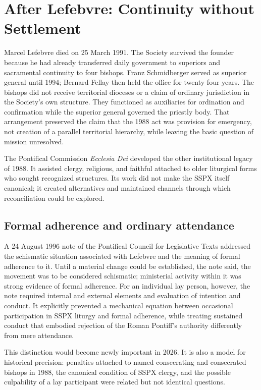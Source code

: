 \section{After Lefebvre: Continuity without Settlement}

Marcel Lefebvre died on 25 March 1991. The Society survived the founder because he had already transferred daily government to superiors and sacramental continuity to four bishops. Franz Schmidberger served as superior general until 1994; Bernard Fellay then held the office for twenty-four years. The bishops did not receive territorial dioceses or a claim of ordinary jurisdiction in the Society's own structure. They functioned as auxiliaries for ordination and confirmation while the superior general governed the priestly body. That arrangement preserved the claim that the 1988 act was provision for emergency, not creation of a parallel territorial hierarchy, while leaving the basic question of mission unresolved.

The Pontifical Commission \emph{Ecclesia Dei} developed the other institutional legacy of 1988. It assisted clergy, religious, and faithful attached to older liturgical forms who sought recognized structures. Its work did not make the SSPX itself canonical; it created alternatives and maintained channels through which reconciliation could be explored.

\subsection{Formal adherence and ordinary attendance}

A 24 August 1996 note of the Pontifical Council for Legislative Texts addressed the schismatic situation associated with Lefebvre and the meaning of formal adherence to it. Until a material change could be established, the note said, the movement was to be considered schismatic; ministerial activity within it was strong evidence of formal adherence. For an individual lay person, however, the note required internal and external elements and evaluation of intention and conduct. It explicitly prevented a mechanical equation between occasional participation in SSPX liturgy and formal adherence, while treating sustained conduct that embodied rejection of the Roman Pontiff's authority differently from mere attendance.

This distinction would become newly important in 2026. It is also a model for historical precision: penalties attached to named consecrating and consecrated bishops in 1988, the canonical condition of SSPX clergy, and the possible culpability of a lay participant were related but not identical questions.


